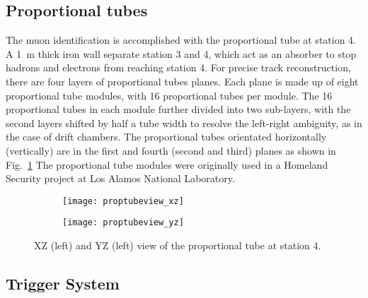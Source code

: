 \documentclass[../main.tex]{subfiles}
\begin{document}
\subsection{Proportional tubes}
The muon identification is accomplished with the proportional tube at station 4. A \SI{1}{\meter} thick
iron wall separate station 3 and 4, which act as an absorber to stop hadrons and electrons from reaching
station 4. For precise track reconstruction, there are four layers of proportional tubes planes. Each plane
is made up of eight proportional tube modules, with 16 proportional tubes per module. The 16 proportional tubes
in each module further divided into two sub-layers, with the second layers shifted by half a tube width to
resolve the left-right ambiguity, as in the case of drift chambers. The proportional tubes orientated horizontally
(vertically) are in the first and fourth (second and third) planes as shown in Fig.~\ref{fig:prop}
The proportional tube modules were originally used in a Homeland Security project at Los Alamos National Laboratory.

\begin{figure}[ht!]
\centering
\begin{subfigure}{0.45\linewidth}
\texttt{[image: proptubeview\_xz]}
\end{subfigure}
\begin{subfigure}{0.45\linewidth}
\texttt{[image: proptubeview\_yz]}
\end{subfigure}
\caption{XZ (left) and YZ (left) view of the proportional tube at station 4.}
\label{fig:prop}
\end{figure}
\subsection{Trigger System}


\ifSubfilesClassLoaded{ \printbibliography[heading=bibintoc,title={References}]}{}
\end{document}
